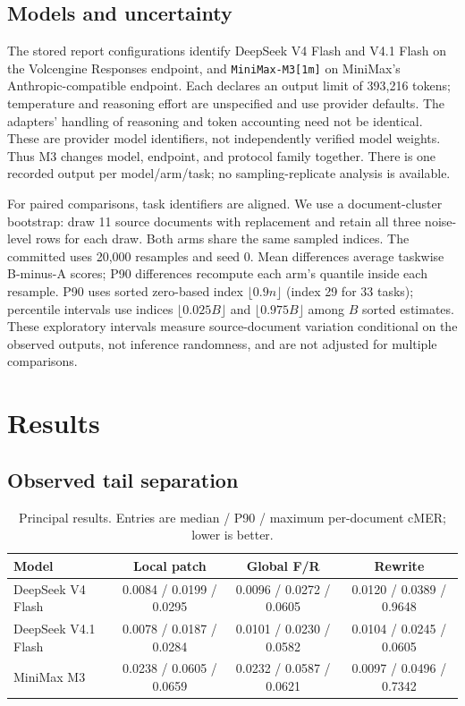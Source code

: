 \documentclass{article}
\begin{document}
\subsection{Models and uncertainty}
The stored report configurations identify DeepSeek V4 Flash and V4.1 Flash on the Volcengine Responses endpoint, and \texttt{MiniMax-M3[1m]} on MiniMax's Anthropic-compatible endpoint. Each declares an output limit of 393,216 tokens; temperature and reasoning effort are unspecified and use provider defaults. The adapters' handling of reasoning and token accounting need not be identical. These are provider model identifiers, not independently verified model weights. Thus M3 changes model, endpoint, and protocol family together. There is one recorded output per model/arm/task; no sampling-replicate analysis is available.

For paired comparisons, task identifiers are aligned. We use a document-cluster bootstrap: draw 11 source documents with replacement and retain all three noise-level rows for each draw. Both arms share the same sampled indices. The committed  uses 20,000 resamples and seed 0. Mean differences average taskwise B-minus-A scores; P90 differences recompute each arm's quantile inside each resample. P90 uses sorted zero-based index $\lfloor0.9n\rfloor$ (index 29 for 33 tasks); percentile intervals use indices $\lfloor0.025B\rfloor$ and $\lfloor0.975B\rfloor$ among $B$ sorted estimates. These exploratory intervals measure source-document variation conditional on the observed outputs, not inference randomness, and are not adjusted for multiple comparisons.

\section{Results}
\subsection{Observed tail separation}
\begin{table}[t]
\centering\small
\caption{Principal results. Entries are median / P90 / maximum per-document cMER; lower is better.}
\label{tab:main}
\begin{tabular}{lccc}
\toprule
Model & Local patch & Global F/R & Rewrite\\
\midrule
DeepSeek V4 Flash & 0.0084 / 0.0199 / 0.0295 & 0.0096 / 0.0272 / 0.0605 & 0.0120 / 0.0389 / 0.9648\\
DeepSeek V4.1 Flash & 0.0078 / 0.0187 / 0.0284 & 0.0101 / 0.0230 / 0.0582 & 0.0104 / 0.0245 / 0.0605\\
MiniMax M3 & 0.0238 / 0.0605 / 0.0659 & 0.0232 / 0.0587 / 0.0621 & 0.0097 / 0.0496 / 0.7342\\
\bottomrule
\end{tabular}
\end{table}
\end{document}

